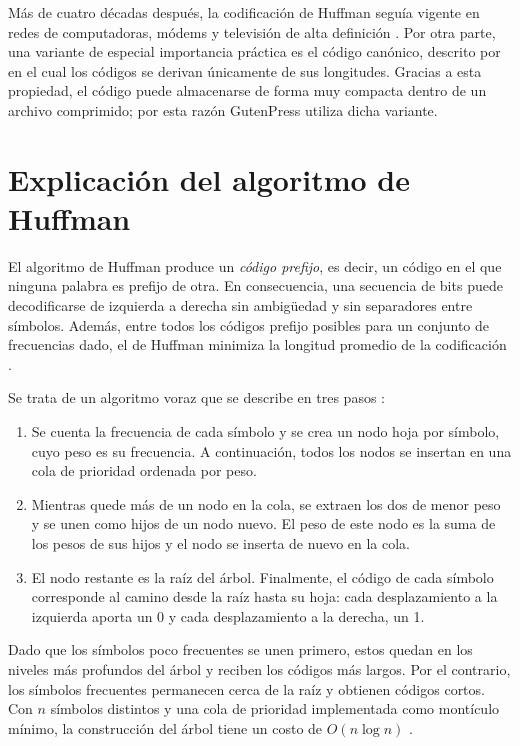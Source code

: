 \documentclass{report}
\begin{document}
Más de cuatro décadas después, la codificación de Huffman seguía vigente en redes de computadoras, módems y televisión de alta definición \cite{stix91}. Por otra parte, una variante de especial importancia práctica es el código canónico, descrito por  en el cual los códigos se derivan únicamente de sus longitudes. Gracias a esta propiedad, el código puede almacenarse de forma muy compacta dentro de un archivo comprimido; por esta razón GutenPress utiliza dicha variante.

\section{Explicación del algoritmo de Huffman}\label{explicacion}

El algoritmo de Huffman produce un \emph{código prefijo}, es decir, un código en el que ninguna palabra es prefijo de otra. En consecuencia, una secuencia de bits puede decodificarse de izquierda a derecha sin ambigüedad y sin separadores entre símbolos. Además, entre todos los códigos prefijo posibles para un conjunto de frecuencias dado, el de Huffman minimiza la longitud promedio de la codificación \cite{huffman52}.

Se trata de un algoritmo voraz que se describe en tres pasos :

\begin{enumerate}
    \item Se cuenta la frecuencia de cada símbolo y se crea un nodo hoja por símbolo, cuyo peso es su frecuencia. A continuación, todos los nodos se insertan en una cola de prioridad ordenada por peso.
    \item Mientras quede más de un nodo en la cola, se extraen los dos de menor peso y se unen como hijos de un nodo nuevo. El peso de este nodo es la suma de los pesos de sus hijos y el nodo se inserta de nuevo en la cola.
    \item El nodo restante es la raíz del árbol. Finalmente, el código de cada símbolo corresponde al camino desde la raíz hasta su hoja: cada desplazamiento a la izquierda aporta un 0 y cada desplazamiento a la derecha, un 1.
\end{enumerate}

Dado que los símbolos poco frecuentes se unen primero, estos quedan en los niveles más profundos del árbol y reciben los códigos más largos. Por el contrario, los símbolos frecuentes permanecen cerca de la raíz y obtienen códigos cortos. Con $n$ símbolos distintos y una cola de prioridad implementada como montículo mínimo, la construcción del árbol tiene un costo de $O(n \log n)$ .
\end{document}
